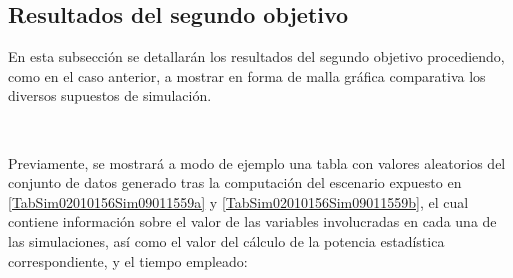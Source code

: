 \documentclass[IB,BIB]{TFUOC}%
\begin{document}
\newpage
\subsection{Resultados del segundo objetivo}
\label{sec:Resultados del segundo objetivo}

En esta subsección se detallarán los resultados del segundo objetivo procediendo, como en el caso anterior, a mostrar en forma de malla gráfica comparativa los diversos supuestos de simulación. 

\

Previamente, se mostrará a modo de ejemplo una tabla con valores aleatorios del conjunto de datos generado tras la computación del escenario expuesto en \ref{TabSim02010156Sim09011559a} y \ref{TabSim02010156Sim09011559b}, el cual contiene información sobre el valor de las variables involucradas en cada una de las simulaciones, así como el valor del cálculo de la potencia estadística correspondiente, y el tiempo empleado:
\end{document}
